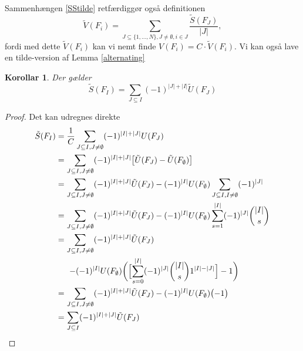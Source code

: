 \documentclass[a4paper, 12pt]{article}
\newtheorem{korollar}{Korollar}
\begin{document}
Sammenhængen \eqref{SStilde} retfærdiggør også definitionen
\begin{equation}
\tilde V(F_i)=\sum_{J\subseteq\{1,\dots, N\}, J\neq \emptyset, i\in J} \frac{\tilde S(F_J)}{|J|},
\end{equation}
fordi med dette $\tilde V(F_i)$ kan vi nemt finde $V(F_i)=C\cdot \tilde V(F_i)$. Vi kan også lave en tilde-version af Lemma \ref{alternating}
\begin{korollar}\label{alternating_tilde}
Der gælder
\begin{equation}
\tilde S(F_I)=\sum_{J\subseteq I} (-1)^{|J|+|I|} \tilde U(F_J)
\end{equation}
\end{korollar}
\begin{proof}
Det kan udregnes direkte
\begin{align*}
\tilde S(F_I)&=\frac{1}{C}\sum_{J\subseteq I, J\neq \emptyset} (-1)^{|I|+|J|} U(F_J)\\
&=\sum_{J\subseteq I, J\neq \emptyset} (-1)^{|I|+|J|} \bigl[\tilde U(F_J)-\tilde U(F_{\emptyset})\bigr]\\
&=\sum_{J\subseteq I, J\neq \emptyset} (-1)^{|I|+|J|} \tilde U(F_J) -(-1)^{|I|}U(F_{\emptyset})\sum_{J\subseteq I, I\neq \emptyset} (-1)^{|J|}\\
&=\sum_{J\subseteq I, J\neq \emptyset} (-1)^{|I|+|J|} \tilde U(F_J) -(-1)^{|I|}U(F_{\emptyset})\sum_{s=1}^{|I|} (-1)^{|J|}{|I| \choose s}\\
&=\begin{lgathered}[t]\sum_{J\subseteq I, J\neq \emptyset} (-1)^{|I|+|J|} \tilde U(F_J)\\ \,\,-(-1)^{|I|}U(F_{\emptyset})\biggl(\Bigl[\sum_{s=0}^{|I|} (-1)^{|J|}{|I| \choose s}1^{|I|-|J|}\Bigr]-1\biggr)\end{lgathered}\\
&=\sum_{J\subseteq I, J\neq \emptyset} (-1)^{|I|+|J|} \tilde U(F_J) -(-1)^{|I|}U(F_{\emptyset})\bigl(-1\bigr)\\
&=\sum_{J\subseteq I} (-1)^{|I|+|J|} \tilde U(F_J)
\end{align*}
\end{proof}
\end{document}
